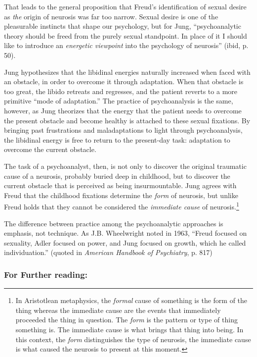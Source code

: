 That leads to the general proposition that Freud's identification of sexual desire as \emph{the} origin of neurosis was far too narrow. Sexual desire is one of the pleasurable instincts that shape our psychology, but for Jung, ``psychoanalytic theory should be freed from the purely sexual standpoint. In place of it I should like to introduce an \emph{energetic viewpoint} into the psychology of neurosis'' (ibid, p. 50).

Jung hypothesizes that the libidinal energies naturally increased when faced with an obstacle, in order to overcome it through adaptation. When that obstacle is too great, the libido retreats and regresses, and the patient reverts to a more primitive ``mode of adaptation.'' The practice of psychoanalysis is the same, however, as Jung theorizes that the energy that the patient needs to overcome the present obstacle and become healthy is attached to these sexual fixations. By bringing past frustrations and maladaptations to light through psychoanalysis, the libidinal energy is free to return to the present-day task: adaptation to overcome the current obstacle.

The task of a psychoanalyst, then, is not only to discover the original traumatic cause of a neurosis, probably buried deep in childhood, but to discover the current obstacle that is perceived as being insurmountable. Jung agrees with Freud that the childhood fixations determine the \emph{form} of neurosis, but unlike Freud holds that they cannot be considered the \emph{immediate cause} of neurosis.\footnote{In Aristotlean metaphysics, the \emph{formal} cause of something is the form of the thing whereas the immediate cause are the events that immediately proceeded the thing in question. The \emph{form} is the pattern or type of thing something is. The immediate cause is what brings that thing into being. In this context, the \emph{form} distinguishes the type of neurosis, the immediate cause is what caused the neurosis to present at this moment.}

The difference between practice among the psychoanalytic approaches is emphasis, not technique. As J.B. Wheelwright noted in 1963, ``Freud focused on sexuality, Adler focused on power, and Jung focused on growth, which he called individuation.'' (quoted in \emph{American Handbook of Psychiatry}, p. 817)

\subsubsection{For Further reading:}
\label{forfurtherreading:}

